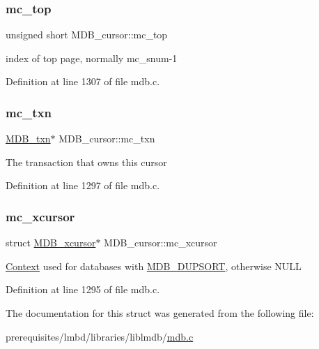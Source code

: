 \subsubsection{\texorpdfstring{mc\+\_\+top}{mc\_top}}
{\footnotesize\ttfamily unsigned short M\+D\+B\+\_\+cursor\+::mc\+\_\+top}

index of top page, normally mc\+\_\+snum-\/1 

Definition at line 1307 of file mdb.\+c.

\mbox{\label{struct_m_d_b__cursor_a15053edbec5a11acad196428db6604ed}} 
\subsubsection{\texorpdfstring{mc\+\_\+txn}{mc\_txn}}
{\footnotesize\ttfamily \mbox{\hyperlink{struct_m_d_b__txn}{M\+D\+B\+\_\+txn}}$\ast$ M\+D\+B\+\_\+cursor\+::mc\+\_\+txn}

The transaction that owns this cursor 

Definition at line 1297 of file mdb.\+c.

\mbox{\label{struct_m_d_b__cursor_af7b8db7b9c6d16e437a4f2863059b560}} 
\subsubsection{\texorpdfstring{mc\+\_\+xcursor}{mc\_xcursor}}
{\footnotesize\ttfamily struct \mbox{\hyperlink{struct_m_d_b__xcursor}{M\+D\+B\+\_\+xcursor}}$\ast$ M\+D\+B\+\_\+cursor\+::mc\+\_\+xcursor}

\mbox{\hyperlink{struct_context}{Context}} used for databases with \mbox{\hyperlink{group__mdb__dbi__open_gae0626566c2562e9007f5c8c9535bab1a}{M\+D\+B\+\_\+\+D\+U\+P\+S\+O\+RT}}, otherwise N\+U\+LL 

Definition at line 1295 of file mdb.\+c.



The documentation for this struct was generated from the following file\+:\begin{DoxyCompactItemize}
\item 
prerequisites/lmbd/libraries/liblmdb/\mbox{\hyperlink{mdb_8c}{mdb.\+c}}\end{DoxyCompactItemize}
